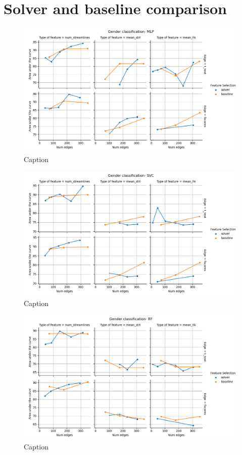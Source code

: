 \documentclass[msthesis.tex]{subfiles}
\begin{document}
\section{Solver and baseline comparison}
\begin{figure}
    \centering
    \includegraphics[width = \textwidth]{images/comparison_roc_auc_MLP.png}
    \caption{Caption}
    \label{fig:mlpgender}
\end{figure}
\begin{figure}
    \centering
    \includegraphics[width = \textwidth]{images/comparison_roc_auc_SVC.png}
    \caption{Caption}
    \label{fig:svcgender}
\end{figure}

\begin{figure}
    \centering
    \includegraphics[width = \textwidth]{images/comparison_roc_auc_RF.png}
    \caption{Caption}
    \label{fig:rfgender}
\end{figure}
\fi
\end{document}

